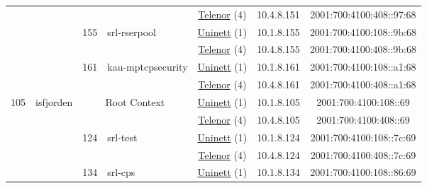 \begin{small}
\begin{center}
\begin{longtable}{|c|c|c|c|c|c|c|c|}
  &  &  &  & \multicolumn{2}{|c|}{\tiny{\href{https://www.telenor.no}{Telenor} (4)}} & \tiny{10.4.8.151} & \tiny{2001:700:4100:408::97:68} \\* \cline{3-3}\cline{4-4}\cline{5-5}\cline{6-6}\cline{7-7}\cline{8-8}
  &  & \multirow{2}{*}{\tiny{155}} & \multicolumn{1}{|l|}{\multirow{2}{*}{\tiny{srl-rserpool}}} & \multicolumn{2}{|c|}{\tiny{\href{https://www.uninett.no}{Uninett} (1)}} & \tiny{10.1.8.155} & \tiny{2001:700:4100:108::9b:68} \\* \cline{5-5}\cline{6-6}\cline{7-7}\cline{8-8}
  &  &  &  & \multicolumn{2}{|c|}{\tiny{\href{https://www.telenor.no}{Telenor} (4)}} & \tiny{10.4.8.155} & \tiny{2001:700:4100:408::9b:68} \\* \cline{3-3}\cline{4-4}\cline{5-5}\cline{6-6}\cline{7-7}\cline{8-8}
  &  & \multirow{2}{*}{\tiny{161}} & \multicolumn{1}{|l|}{\multirow{2}{*}{\tiny{kau-mptcpsecurity}}} & \multicolumn{2}{|c|}{\tiny{\href{https://www.uninett.no}{Uninett} (1)}} & \tiny{10.1.8.161} & \tiny{2001:700:4100:108::a1:68} \\* \cline{5-5}\cline{6-6}\cline{7-7}\cline{8-8}
  &  &  &  & \multicolumn{2}{|c|}{\tiny{\href{https://www.telenor.no}{Telenor} (4)}} & \tiny{10.4.8.161} & \tiny{2001:700:4100:408::a1:68} \\ \hline
 \multirow{14}{*}{\tiny{105}} & \multicolumn{1}{|l|}{\multirow{14}{*}{\tiny{isfjorden}}} & \multicolumn{2}{|c|}{\multirow{2}{*}{\tiny{Root Context}}} & \multicolumn{2}{|c|}{\tiny{\href{https://www.uninett.no}{Uninett} (1)}} & \tiny{10.1.8.105} & \tiny{2001:700:4100:108::69} \\* \cline{5-5}\cline{6-6}\cline{7-7}\cline{8-8}
  &  & \multicolumn{2}{|c|}{} & \multicolumn{2}{|c|}{\tiny{\href{https://www.telenor.no}{Telenor} (4)}} & \tiny{10.4.8.105} & \tiny{2001:700:4100:408::69} \\* \cline{3-3}\cline{4-4}\cline{5-5}\cline{6-6}\cline{7-7}\cline{8-8}
  &  & \multirow{2}{*}{\tiny{124}} & \multicolumn{1}{|l|}{\multirow{2}{*}{\tiny{srl-test}}} & \multicolumn{2}{|c|}{\tiny{\href{https://www.uninett.no}{Uninett} (1)}} & \tiny{10.1.8.124} & \tiny{2001:700:4100:108::7c:69} \\* \cline{5-5}\cline{6-6}\cline{7-7}\cline{8-8}
  &  &  &  & \multicolumn{2}{|c|}{\tiny{\href{https://www.telenor.no}{Telenor} (4)}} & \tiny{10.4.8.124} & \tiny{2001:700:4100:408::7c:69} \\* \cline{3-3}\cline{4-4}\cline{5-5}\cline{6-6}\cline{7-7}\cline{8-8}
  &  & \multirow{2}{*}{\tiny{134}} & \multicolumn{1}{|l|}{\multirow{2}{*}{\tiny{srl-cps}}} & \multicolumn{2}{|c|}{\tiny{\href{https://www.uninett.no}{Uninett} (1)}} & \tiny{10.1.8.134} & \tiny{2001:700:4100:108::86:69} \\* \cline{5-5}\cline{6-6}\cline{7-7}\cline{8-8}

\end{longtable}
\end{center}
\end{small}
